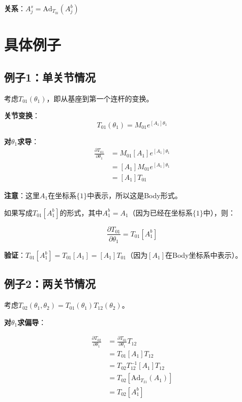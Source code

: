 \documentclass[12pt,a4paper]{article}
\begin{document}
\textbf{关系}：$A_j^s = \text{Ad}_{T_{0i}}(A_j^b)$

\section{具体例子}

\subsection{例子1：单关节情况}

考虑$T_{01}(\theta_1)$，即从基座到第一个连杆的变换。

\textbf{关节变换}：
\begin{equation}
T_{01}(\theta_1) = M_{01} e^{[A_1]\theta_1}
\end{equation}

\textbf{对$\theta_1$求导}：
\begin{align}
\frac{\partial T_{01}}{\partial \theta_1} &= M_{01} [A_1] e^{[A_1]\theta_1} \\
&= [A_1] M_{01} e^{[A_1]\theta_1} \\
&= [A_1] T_{01}
\end{align}

\textbf{注意}：这里$A_1$在坐标系$\{1\}$中表示，所以这是Body形式。

如果写成$T_{01} [A_1^b]$的形式，其中$A_1^b = A_1$（因为已经在坐标系$\{1\}$中），则：

\begin{equation}
\frac{\partial T_{01}}{\partial \theta_1} = T_{01} [A_1^b]
\end{equation}

\textbf{验证}：$T_{01} [A_1^b] = T_{01} [A_1] = [A_1] T_{01}$（因为$[A_1]$在Body坐标系中表示）。

\subsection{例子2：两关节情况}

考虑$T_{02}(\theta_1, \theta_2) = T_{01}(\theta_1) T_{12}(\theta_2)$。

\textbf{对$\theta_1$求偏导}：

\begin{align}
\frac{\partial T_{02}}{\partial \theta_1} &= \frac{\partial T_{01}}{\partial \theta_1} T_{12} \\
&= T_{01} [A_1] T_{12} \\
&= T_{02} T_{12}^{-1} [A_1] T_{12} \\
&= T_{02} [\text{Ad}_{T_{21}}(A_1)] \\
&= T_{02} [A_1^b]
\end{align}
\end{document}
